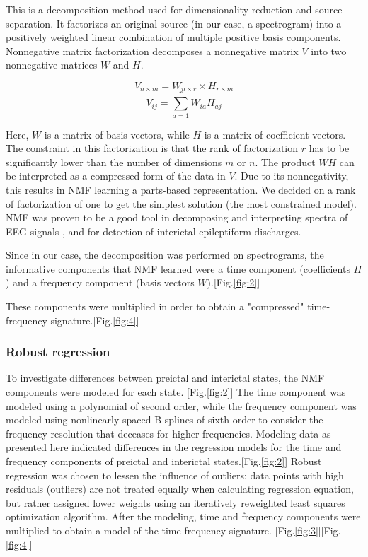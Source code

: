 \documentclass{article}
\begin{document}
This is a decomposition method used for dimensionality reduction and source separation. It factorizes an original source (in our case, a spectrogram) into a positively weighted linear combination of multiple positive basis components. Nonnegative matrix factorization decomposes a nonnegative matrix $V$ into two nonnegative matrices $W$ and $H$. 

$$V_{n \times m} = W_{n \times r} \times H_{r \times m}$$
$$V_{ij}=\sum_{a=1}^r W_{ia}H_{aj}$$ 

\noindent Here, $W$ is a matrix of basis vectors, while $H$ is a matrix of coefficient vectors. The constraint in this factorization is that the rank of factorization $r$ has to be significantly lower than the number of dimensions $m$ or $n$.  The product $WH$ can be interpreted as a compressed form of the data in $V$.  Due to its nonnegativity, this results in NMF learning a parts-based representation.  We decided on a rank of factorization of one to get the simplest solution (the most constrained model). NMF was proven to be a good tool in decomposing and interpreting spectra of EEG signals ,  and for detection of interictal epileptiform discharges.  

Since in our case, the decomposition was performed on spectrograms, the informative components that NMF learned were a time component (coefficients $H$) and a frequency component (basis vectors $W$).[Fig.\ref{fig:2}]


These components were multiplied in order to obtain a "compressed" time-frequency signature.[Fig.\ref{fig:4}]


\subsubsection{Robust regression}

To investigate differences between preictal and interictal states, the NMF components were modeled for each state. [Fig.\ref{fig:2}] The time component was modeled using a polynomial of second order, while the frequency component was modeled using nonlinearly spaced B-splines of sixth order to consider the frequency resolution that deceases for higher frequencies. Modeling data as presented here indicated differences in the regression models for the time and frequency components of preictal and interictal states.[Fig.\ref{fig:2}] Robust regression was chosen to lessen the influence of outliers: data points with high residuals (outliers) are not treated equally when calculating regression equation, but rather assigned lower weights using an iteratively reweighted least squares optimization algorithm. 
After the modeling, time and frequency components were multiplied to obtain a model of the time-frequency signature. [Fig.\ref{fig:3}][Fig.\ref{fig:4}]
\end{document}
